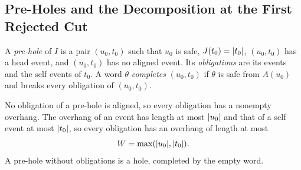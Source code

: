 \subsection{Pre-Holes and the Decomposition at the First Rejected Cut}\label{sec:nm-prehole}

\begin{definition}\label{def:nm-prehole}
A \emph{pre-hole} of $I$ is a pair $(u_0,t_0)$ such that $u_0$ is safe,
$J(t_0)=\lvert t_0\rvert$, $(u_0,t_0)$ has a head event, and $(u_0,t_0)$ has no aligned
event. Its \emph{obligations} are its events and the self events of $t_0$. A
word $\theta$ \emph{completes} $(u_0,t_0)$ if $\theta$ is safe from $A(u_0)$ and
breaks every obligation of $(u_0,t_0)$.
\end{definition}

No obligation of a pre-hole is aligned, so every obligation has a nonempty
overhang. The overhang of an event has length at most $\lvert u_0\rvert$ and that of a
self event at most $\lvert t_0\rvert$, so every obligation has an overhang of length at
most
\[
 W=\max(\lvert u_0\rvert,\lvert t_0\rvert).
\]
A pre-hole without obligations is a hole, completed by the empty word.

